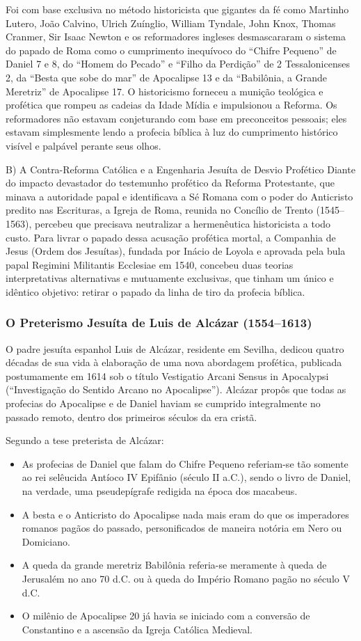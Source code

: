 Foi com base exclusiva no método historicista que gigantes da fé como Martinho Lutero, João Calvino, Ulrich Zuínglio, William Tyndale, John Knox, Thomas Cranmer, Sir Isaac Newton e os reformadores ingleses desmascararam o sistema do papado de Roma como o cumprimento inequívoco do ``Chifre Pequeno'' de Daniel 7 e 8, do ``Homem do Pecado'' e ``Filho da Perdição'' de 2 Tessalonicenses 2, da ``Besta que sobe do mar'' de Apocalipse 13 e da ``Babilônia, a Grande Meretriz'' de Apocalipse 17. O historicismo forneceu a munição teológica e profética que rompeu as cadeias da Idade Mídia e impulsionou a Reforma. Os reformadores não estavam conjeturando com base em preconceitos pessoais; eles estavam simplesmente lendo a profecia bíblica à luz do cumprimento histórico visível e palpável perante seus olhos.

B) A Contra-Reforma Católica e a Engenharia Jesuíta de Desvio Profético
Diante do impacto devastador do testemunho profético da Reforma Protestante, que minava a autoridade papal e identificava a Sé Romana com o poder do Anticristo predito nas Escrituras, a Igreja de Roma, reunida no Concílio de Trento (1545–1563), percebeu que precisava neutralizar a hermenêutica historicista a todo custo. Para livrar o papado dessa acusação profética mortal, a Companhia de Jesus (Ordem dos Jesuítas), fundada por Inácio de Loyola e aprovada pela bula papal Regimini Militantis Ecclesiae em 1540, concebeu duas teorias interpretativas alternativas e mutuamente exclusivas, que tinham um único e idêntico objetivo: retirar o papado da linha de tiro da profecia bíblica.


\subsubsection*{O Preterismo Jesuíta de Luis de Alcázar (1554–1613)}
O padre jesuíta espanhol Luis de Alcázar, residente em Sevilha, dedicou quatro décadas de sua vida à elaboração de uma nova abordagem profética, publicada postumamente em 1614 sob o título Vestigatio Arcani Sensus in Apocalypsi (``Investigação do Sentido Arcano no Apocalipse''). Alcázar propôs que todas as profecias do Apocalipse e de Daniel haviam se cumprido integralmente no passado remoto, dentro dos primeiros séculos da era cristã.

Segundo a tese preterista de Alcázar:
\begin{itemize}
  \item As profecias de Daniel que falam do Chifre Pequeno referiam-se tão somente ao rei selêucida Antíoco IV Epifânio (século II a.C.), sendo o livro de Daniel, na verdade, uma pseudepígrafe redigida na época dos macabeus.
  \item A besta e o Anticristo do Apocalipse nada mais eram do que os imperadores romanos pagãos do passado, personificados de maneira notória em Nero ou Domiciano.
  \item A queda da grande meretriz Babilônia referia-se meramente à queda de Jerusalém no ano 70 d.C. ou à queda do Império Romano pagão no século V d.C.
  \item O milênio de Apocalipse 20 já havia se iniciado com a conversão de Constantino e a ascensão da Igreja Católica Medieval.
\end{itemize}



